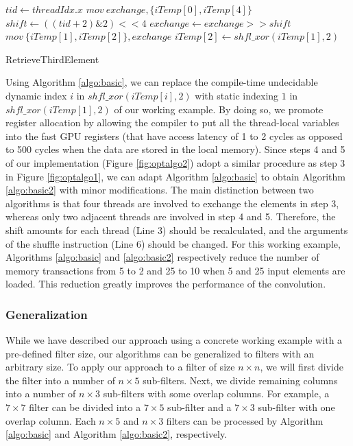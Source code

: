 \begin{algorithm}[t!]
	$tid \gets threadIdx.x$\;
	$mov\ exchange, \{iTemp[0], iTemp[4]\}$\;
	$shift \gets ((tid+2)\&2)<<4$\;
	$exchange \gets exchange >> shift$\;
	$mov\ \{iTemp[1],iTemp[2]\}, exchange$\;
	$iTemp[2] \gets shfl\_xor(iTemp[1],2)$\;	
	
	\caption{RetrieveThirdElement}
	\label{algo:basic}
	
\end{algorithm}

Using Algorithm \ref{algo:basic}, we can replace the compile-time undecidable dynamic index $i$ in $shfl\_xor(iTemp[i],2)$ with static
indexing $1$ in $shfl\_xor(iTemp[1],2)$ of our working example. By doing so, we promote register allocation by allowing the compiler to put
all the thread-local variables into the fast GPU registers (that have access latency of 1 to 2 cycles as opposed to 500 cycles when the
data are stored in the local memory). Since steps 4 and 5 of our implementation (Figure \ref{fig:optalgo2}) adopt a similar procedure as
step 3 in Figure \ref{fig:optalgo1}, we can adapt Algorithm \ref{algo:basic} to obtain Algorithm \ref{algo:basic2} with minor
modifications. {\color{red}The main distinction between two algorithms is that four threads are involved to exchange the elements in step 3, whereas only two adjacent threads are involved in step 4 and 5. Therefore, the shift amounts for each thread (Line 3) should be recalculated, and the arguments of the shuffle instruction (Line 6) should be changed.} For this working example, Algorithms \ref{algo:basic} and \ref{algo:basic2} respectively
reduce the number of memory transactions from 5 to 2 and 25 to 10 when 5 and 25 input elements are loaded. This reduction greatly improves
the performance of the convolution.

\subsubsection{Generalization} While we have described our approach using a concrete working example with a pre-defined filter size, our
algorithms can be generalized to filters with an arbitrary size. To apply our approach to a filter of size $n \times n$, we will first
divide the filter into a number of $n \times 5$ sub-filters. Next, we divide remaining columns into a number of $n \times 3$ sub-filters
with some overlap columns. For example, a $7 \times 7$ filter can be divided into a $7 \times 5$ sub-filter and a $7 \times 3$ sub-filter
with one overlap column. Each $n \times 5$ and $n \times 3$ filters can be processed by Algorithm \ref{algo:basic} and Algorithm
\ref{algo:basic2}, respectively.






